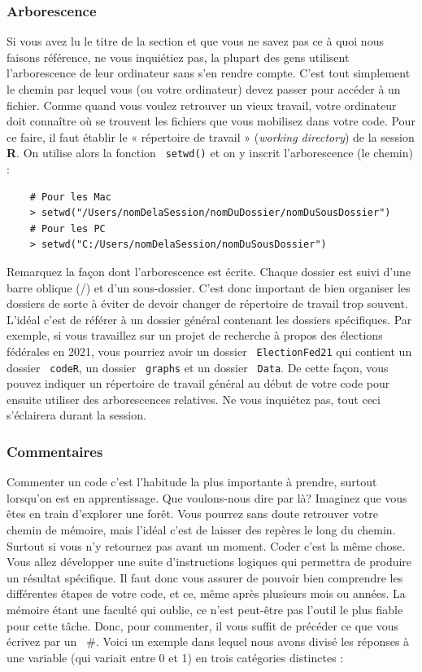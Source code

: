 \documentclass[10.5pt,a4paper]{article}
\newcommand{\rcode}[1]{\texttt{\color{rstudio} #1}}
\begin{document}
    \subsubsection{Arborescence}
    Si vous avez lu le titre de la section et que vous ne savez pas ce à quoi nous faisons référence, ne vous inquiétiez pas, la plupart des gens utilisent l'arborescence de leur ordinateur sans s'en rendre compte. C'est tout simplement le chemin par lequel vous (ou votre ordinateur) devez passer pour accéder à un fichier. Comme quand vous voulez retrouver un vieux travail, votre ordinateur doit connaître où se trouvent les fichiers que vous mobilisez dans votre code. Pour ce faire, il faut établir le « répertoire de travail » (\emph{working directory}) de la session \textbf{R}. On utilise alors la fonction \rcode{setwd()} et on y inscrit l'arborescence (le chemin) :
    
    \begin{lstlisting}
    # Pour les Mac
    > setwd("/Users/nomDelaSession/nomDuDossier/nomDuSousDossier")
    # Pour les PC
    > setwd("C:/Users/nomDelaSession/nomDuSousDossier")
    \end{lstlisting}
    
    Remarquez la façon dont l'arborescence est écrite. Chaque dossier est suivi d'une barre oblique (/) et d'un sous-dossier. C'est donc important de bien organiser les dossiers de sorte à éviter de devoir changer de répertoire de travail trop souvent. L'idéal c'est de référer à un dossier général contenant les dossiers spécifiques. Par exemple, si vous travaillez sur un projet de recherche à propos des élections fédérales en 2021, vous pourriez avoir un dossier \rcode{ElectionFed21} qui contient un dossier \rcode{codeR}, un dossier \rcode{graphs} et un dossier \rcode{Data}. De cette façon, vous pouvez indiquer un répertoire de travail général au début de votre code pour ensuite utiliser des arborescences relatives. Ne vous inquiétez pas, tout ceci s'éclairera durant la session.
    
    \subsubsection{Commentaires}
    
    Commenter un code c'est l'habitude la plus importante à prendre, surtout lorsqu'on est en apprentissage. Que voulons-nous dire par là? Imaginez que vous êtes en train d'explorer une forêt. Vous pourrez sans doute retrouver votre chemin de mémoire, mais l'idéal c'est de laisser des repères le long du chemin. Surtout si vous n'y retournez pas avant un moment. Coder c'est la même chose. Vous allez développer une suite d'instructions logiques qui permettra de produire un résultat spécifique. Il faut donc vous assurer de pouvoir bien comprendre les différentes étapes de votre code, et ce, même après plusieurs mois ou années. La mémoire étant une faculté qui oublie, ce n'est peut-être pas l'outil le plus fiable pour cette tâche. Donc, pour commenter, il vous suffit de précéder ce que vous écrivez par un \rcode{$\#$}. Voici un exemple dans lequel nous avons divisé les réponses à une variable (qui variait entre 0 et 1) en trois catégories distinctes :
    
\end{document}
